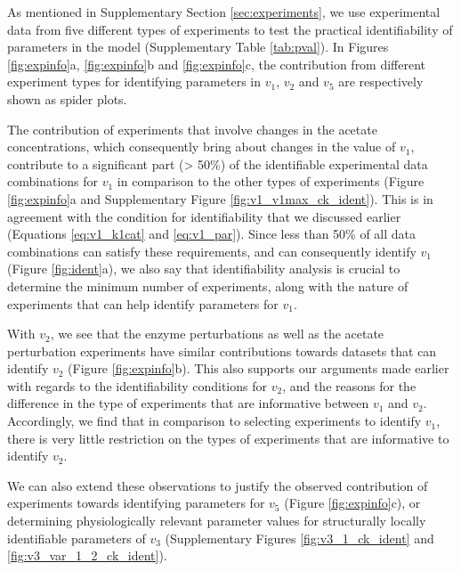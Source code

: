 \documentclass[10pt]{article}
\begin{document}
	As mentioned in Supplementary Section \ref{sec:experiments}, we use experimental data from five different types of experiments to test the practical identifiability of parameters in the model (Supplementary Table \ref{tab:pval}). In Figures \ref{fig:expinfo}a, \ref{fig:expinfo}b and \ref{fig:expinfo}c, the contribution from different experiment types for identifying parameters in $v_1$, $v_2$ and $v_5$ are respectively shown as spider plots. 
	
	The contribution of experiments that involve changes in the acetate concentrations, which consequently bring about changes in the value of $v_1$, contribute to a significant part (> 50\%) of the identifiable experimental data combinations for $v_1$ in comparison to the other types of experiments (Figure \ref{fig:expinfo}a and Supplementary Figure \ref{fig:v1_v1max_ck_ident}). This is in agreement with the condition for identifiability that we discussed earlier (Equations \ref{eq:v1_k1cat} and \ref{eq:v1_par}). Since less than 50\% of all data combinations can satisfy these requirements, and can consequently identify $v_1$ (Figure \ref{fig:ident}a), we also say that identifiability analysis is crucial to determine the minimum number of experiments, along with the nature of experiments that can help identify parameters for $v_1$. 
	
	With $v_2$, we see that the enzyme perturbations as well as the acetate perturbation experiments have similar contributions towards datasets that can identify $v_2$ (Figure \ref{fig:expinfo}b). This also supports our arguments made earlier with regards to the identifiability conditions for $v_2$, and the reasons for the difference in the type of experiments that are informative between $v_1$ and $v_2$. Accordingly, we find that in comparison to selecting experiments to identify $v_1$, there is very little restriction on the types of experiments that are informative to identify $v_2$.
	
	We can also extend these observations to justify the observed contribution of experiments towards identifying parameters for $v_5$ (Figure \ref{fig:expinfo}c), or determining physiologically relevant parameter values for structurally locally identifiable parameters of $v_3$ (Supplementary Figures \ref{fig:v3_1_ck_ident} and \ref{fig:v3_var_1_2_ck_ident}). 
	
\end{document}
